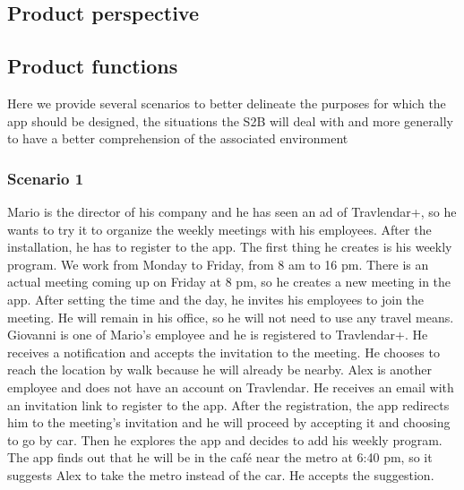 \subsection{Product perspective}
\subsection{Product functions}
Here we provide several scenarios to better delineate the purposes for which the app should be designed, the situations the S2B will deal with and more generally to have a better comprehension of the associated environment

	\subsubsection{Scenario 1}
	Mario is the director of his company and he has seen an ad of Travlendar+, so he wants to try it to organize the weekly meetings with his employees. After the installation, he has to register to the app. The first thing he creates is his weekly program. We work from Monday to Friday, from 8 am to 16 pm.\newline
	There is an actual meeting coming up on Friday at 8 pm, so he creates a new	meeting in the app. After setting the time and the day, he invites his employees to join the meeting. He will remain in his office, so he will not need to use	any travel means.\newline
	Giovanni is one of Mario's employee and he is registered to Travlendar+. He receives a notification and accepts the invitation to the meeting. He chooses to reach the location by walk because he will already be nearby.\newline
	Alex is another employee and does not have an account on Travlendar. He receives an email with an invitation link to register to the app. After the registration, the app redirects him to the meeting's invitation and he will proceed by accepting it and choosing to go by car. Then he explores the app and decides to add his weekly program. The app finds out that he will be in the café near the metro at 6:40 pm, so it suggests Alex to take the metro instead of the car. He accepts the suggestion.
